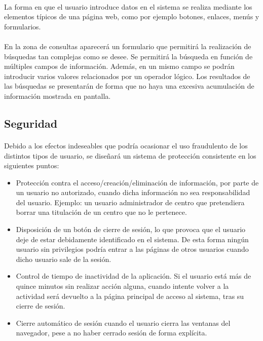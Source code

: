   \paragraph{}La forma en que el usuario introduce datos en el sistema se
  realiza mediante los elementos típicos de una página web, como por ejemplo
  botones, enlaces, menús y formularios.

  \paragraph{}En la zona de consultas aparecerá un formulario que permitirá la
  realización de búsquedas tan complejas como se desee. Se permitirá la búsqueda
  en función de múltiples campos de información. Además, en un mismo campo se
  podrán introducir varios valores relacionados por un operador lógico. Los
  resultados de las búsquedas se presentarán de forma que no haya una excesiva
  acumulación de información mostrada en pantalla.

  \subsection{Seguridad}

  \paragraph{}Debido a los efectos indeseables que podría ocasionar el uso
  fraudulento de los distintos tipos de usuario, se diseñará un sistema de
  protección consistente en los siguientes puntos:

  \begin{itemize}
   \item Protección contra el acceso/creación/eliminación de información, por
   parte de un usuario no autorizado, cuando dicha información no sea
   responsabilidad del usuario. Ejemplo: un usuario administrador de centro que
   pretendiera borrar una titulación de un centro que no le pertenece.
   \item Disposición de un botón de cierre de sesión, lo que provoca que el
   usuario deje de estar debidamente identificado en el sistema. De esta forma
   ningún usuario sin privilegios podría entrar a las páginas de otros usuarios
   cuando dicho usuario sale de la sesión.
   \item Control de tiempo de inactividad de la aplicación. Si el
   usuario está más de quince minutos sin realizar acción alguna, cuando intente
   volver a la actividad será devuelto a la página principal de acceso al
   sistema, tras su cierre de sesión.
   \item Cierre automático de sesión cuando el usuario cierra las ventanas
   del navegador, pese a no haber cerrado sesión de forma explícita.
  \end{itemize}

